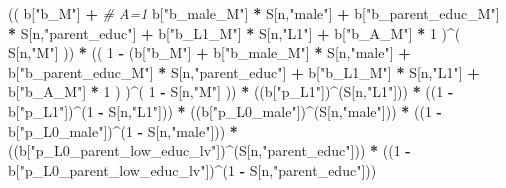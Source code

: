 \documentclass[
]{book}
\newenvironment{Shaded}{\begin{snugshade}}{\end{snugshade}}
\newcommand{\CommentTok}[1]{\textcolor[rgb]{0.56,0.35,0.01}{\textit{#1}}}
\newcommand{\DecValTok}[1]{\textcolor[rgb]{0.00,0.00,0.81}{#1}}
\newcommand{\NormalTok}[1]{#1}
\newcommand{\SpecialCharTok}[1]{\textcolor[rgb]{0.81,0.36,0.00}{\textbf{#1}}}
\newcommand{\StringTok}[1]{\textcolor[rgb]{0.31,0.60,0.02}{#1}}
\begin{document}
\begin{Shaded}
\begin{Highlighting}[]
\NormalTok{      (( b[}\StringTok{"b\_M"}\NormalTok{] }\SpecialCharTok{+}                                                             \CommentTok{\# A\textquotesingle{}=1}
\NormalTok{           b[}\StringTok{"b\_male\_M"}\NormalTok{] }\SpecialCharTok{*}\NormalTok{ S[n,}\StringTok{"male"}\NormalTok{] }\SpecialCharTok{+} 
\NormalTok{           b[}\StringTok{"b\_parent\_educ\_M"}\NormalTok{] }\SpecialCharTok{*}\NormalTok{ S[n,}\StringTok{"parent\_educ"}\NormalTok{] }\SpecialCharTok{+} 
\NormalTok{           b[}\StringTok{"b\_L1\_M"}\NormalTok{] }\SpecialCharTok{*}\NormalTok{ S[n,}\StringTok{"L1"}\NormalTok{] }\SpecialCharTok{+}
\NormalTok{           b[}\StringTok{"b\_A\_M"}\NormalTok{] }\SpecialCharTok{*} \DecValTok{1}\NormalTok{ )}\SpecialCharTok{\^{}}\NormalTok{( S[n,}\StringTok{"M"}\NormalTok{] )) }\SpecialCharTok{*}
\NormalTok{      (( }\DecValTok{1} \SpecialCharTok{{-}}\NormalTok{ (b[}\StringTok{"b\_M"}\NormalTok{] }\SpecialCharTok{+} 
\NormalTok{                b[}\StringTok{"b\_male\_M"}\NormalTok{] }\SpecialCharTok{*}\NormalTok{ S[n,}\StringTok{"male"}\NormalTok{] }\SpecialCharTok{+} 
\NormalTok{                b[}\StringTok{"b\_parent\_educ\_M"}\NormalTok{] }\SpecialCharTok{*}\NormalTok{ S[n,}\StringTok{"parent\_educ"}\NormalTok{] }\SpecialCharTok{+} 
\NormalTok{                b[}\StringTok{"b\_L1\_M"}\NormalTok{] }\SpecialCharTok{*}\NormalTok{ S[n,}\StringTok{"L1"}\NormalTok{] }\SpecialCharTok{+}
\NormalTok{                b[}\StringTok{"b\_A\_M"}\NormalTok{] }\SpecialCharTok{*} \DecValTok{1}\NormalTok{ ) )}\SpecialCharTok{\^{}}\NormalTok{( }\DecValTok{1} \SpecialCharTok{{-}}\NormalTok{ S[n,}\StringTok{"M"}\NormalTok{] )) }\SpecialCharTok{*}
\NormalTok{      ((b[}\StringTok{"p\_L1"}\NormalTok{])}\SpecialCharTok{\^{}}\NormalTok{(S[n,}\StringTok{"L1"}\NormalTok{])) }\SpecialCharTok{*}
\NormalTok{      ((}\DecValTok{1} \SpecialCharTok{{-}}\NormalTok{ b[}\StringTok{"p\_L1"}\NormalTok{])}\SpecialCharTok{\^{}}\NormalTok{(}\DecValTok{1} \SpecialCharTok{{-}}\NormalTok{ S[n,}\StringTok{"L1"}\NormalTok{])) }\SpecialCharTok{*}
\NormalTok{      ((b[}\StringTok{"p\_L0\_male"}\NormalTok{])}\SpecialCharTok{\^{}}\NormalTok{(S[n,}\StringTok{"male"}\NormalTok{])) }\SpecialCharTok{*} 
\NormalTok{      ((}\DecValTok{1} \SpecialCharTok{{-}}\NormalTok{ b[}\StringTok{"p\_L0\_male"}\NormalTok{])}\SpecialCharTok{\^{}}\NormalTok{(}\DecValTok{1} \SpecialCharTok{{-}}\NormalTok{ S[n,}\StringTok{"male"}\NormalTok{])) }\SpecialCharTok{*} 
\NormalTok{      ((b[}\StringTok{"p\_L0\_parent\_low\_educ\_lv"}\NormalTok{])}\SpecialCharTok{\^{}}\NormalTok{(S[n,}\StringTok{"parent\_educ"}\NormalTok{])) }\SpecialCharTok{*}
\NormalTok{      ((}\DecValTok{1} \SpecialCharTok{{-}}\NormalTok{ b[}\StringTok{"p\_L0\_parent\_low\_educ\_lv"}\NormalTok{])}\SpecialCharTok{\^{}}\NormalTok{(}\DecValTok{1} \SpecialCharTok{{-}}\NormalTok{ S[n,}\StringTok{"parent\_educ"}\NormalTok{])) }
    

\end{Highlighting}
\end{Shaded}
\end{document}
